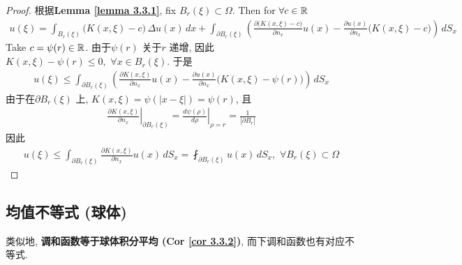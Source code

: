 \begin{proposition}
		\begin{proof}
			根据\textbf{Lemma \ref{lemma 3.3.1}}, fix $B_r(\xi) \subset \Omega$. Then for $\forall c \in \mathbb{R}$
			\begin{align*}
				u(\xi) 
				= \int_{B_{r}(\xi)} \Big( K(x , \xi) - c \Big) \, \Delta u(x) \, dx 
				+ \int_{\partial B_{r}(\xi)} \left( \frac{\partial \Big( K(x , \xi) - c \Big)}{\partial n_x} u(x) - \frac{\partial u(x)}{\partial n_x} \Big( K(x , \xi) - c \Big) \right) \, dS_x
			\end{align*}
			Take $c = \psi(r) \in \mathbb{R}$. 由于$\psi(r)$ 关于$r$ 递增, 因此$K(x , \xi) - \psi(r) \leq 0 , \,\, \forall x \in B_{r}(\xi)$. 于是
			\begin{align*}
				u(\xi) 
				\leq \int_{\partial B_{r}(\xi)} \left( \frac{\partial K(x , \xi)}{\partial n_x} u(x) - \frac{\partial u(x)}{\partial n_x} \Big( K(x , \xi) - \psi(r) \Big) \right) \, dS_x
			\end{align*}
			由于在$\partial B_{r}(\xi)$ 上, $K(x , \xi) = \psi(|x - \xi|) = \psi(r)$, 且
			\begin{align*}
				\left. \frac{\partial K(x , \xi)}{\partial n_x} \right|_{\partial B_{r}(\xi)} 
				= \left. \frac{d\psi(\rho)}{d\rho} \right|_{\rho = r} 
				= \frac{1}{| \partial B_{r} |}
			\end{align*}
			因此
			\begin{align*}
				u(\xi) 
				\leq \int_{\partial B_{r}(\xi)} \frac{\partial K(x , \xi)}{\partial n_x} u(x) \, dS_x 
				= \fint_{\partial B_{r}(\xi)} u(x) \, dS_x , \,\, \forall B_{r}(\xi) \subset \Omega
			\end{align*}
		\end{proof}
	\end{proposition}
	
\newpage
	
\subsection{均值不等式 (球体)}
	类似地, \textbf{调和函数等于球体积分平均 (Cor \ref{cor 3.3.2})}, 而下调和函数也有对应不等式. 
	
	\vspace{1em}
	
